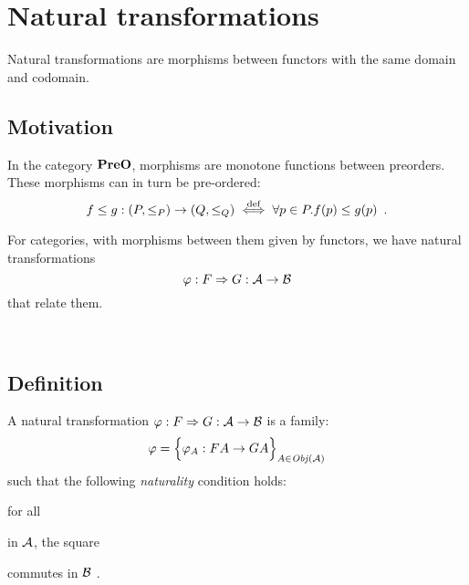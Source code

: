 \chapter{Natural transformations}

Natural transformations are morphisms between functors with the same domain
and codomain.  

\section{Motivation}

In the category $\mathbf {PreO}$, morphisms are monotone functions between
preorders.  These morphisms can in turn be pre-ordered:
\[
  f \le g : (P, \le_P) \to (Q, \le_Q)
  \stackrel{\text{def}}{\iff} \forall p \in P. f(p) \le g(p) \enspace.
\]

For categories, with morphisms between them given by functors, we have natural
transformations 
\[
  \varphi: F \Rightarrow G: \mathcal{A}\to \mathcal{B}
\]
that relate them.

\begin{center}
    \\[3mm]
\end{center}

\section{Definition}

\begin{definition}

A natural transformation $\varphi: F \Rightarrow G : \mathcal{A} \to \mathcal{B}$ is
a family:
\[
  \varphi = \Big \{ \varphi_A : F A \to G A \Big \}_{A \in \operatorname{\mathit{Obj}}(\mathcal{A})}
\]
such that the following \emph{naturality} condition holds:
\begin{center}
    for all
    \enspace
    in $\mathcal{A}$,
    the square 
    \enspace
    commutes in $\mathcal{B}$
    \enspace.
\end{center}

\end{definition}

